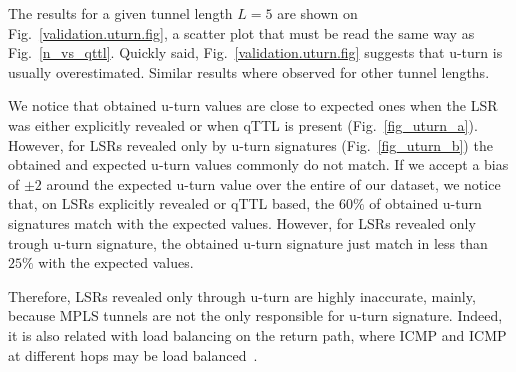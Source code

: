 The results for a given tunnel length $L=5$ are shown on
Fig.~\ref{validation.uturn.fig}, a scatter plot that must be read the same way
as Fig.~\ref{n_vs_qttl}.  Quickly said, Fig.~\ref{validation.uturn.fig} suggests
that u-turn is usually overestimated. Similar results where observed for other
tunnel lengths. 

We notice that obtained u-turn values are close to expected ones when the LSR
was either explicitly revealed or when qTTL is present (Fig.~\ref{fig_uturn_a}).
However, for LSRs revealed only by u-turn signatures (Fig.~\ref{fig_uturn_b})
the obtained and expected u-turn values commonly do not match. If we accept a
bias of $ \pm 2$ around the expected u-turn value over the entire of our
dataset, we notice that, on LSRs
explicitly revealed or qTTL based, the $60\%$ of obtained u-turn signatures
match with the expected values. However, for LSRs revealed only trough u-turn
signature, the obtained u-turn signature just match in less than $25\%$  with
the expected values.

Therefore, LSRs revealed only through u-turn are highly inaccurate, mainly,
because MPLS tunnels are not the only responsible for u-turn signature. Indeed, it is
also related with load balancing on the return path, where ICMP \echoreply and
ICMP \ttlexceeded at different hops may be load balanced~\cite{BRICE06}. 



